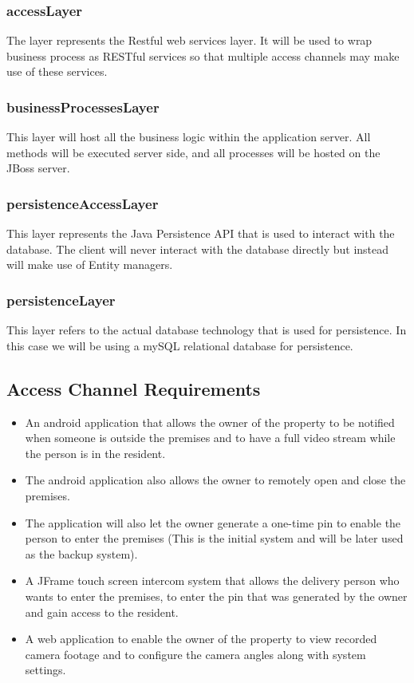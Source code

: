 \documentclass[a4paper,12pt]{article}
\begin{document}
	\subsubsection{accessLayer}
	The layer represents the Restful web services layer. It will be used to wrap business process as RESTful services so that multiple access channels may make use of these services. 
	\subsubsection{businessProcessesLayer}
	This layer will host all the business logic within the application server. All methods will be executed server side, and all processes will be hosted on the JBoss server.
	\subsubsection{persistenceAccessLayer}
	This layer represents the Java Persistence API that is used to interact with the database. The client will never interact with the database directly but instead will make use of Entity managers.
	\subsubsection{persistenceLayer}
	This layer refers to the actual database technology that is used for persistence. In this case we will be using a mySQL relational database for persistence.
	
	\subsection{Access Channel Requirements}
	\begin{itemize}
		\item An android application that allows the owner of the property to be notified when someone is outside the premises and to have a full video stream while the person is in the resident.
		
		\item The android application also allows the owner to remotely open and close the premises.
		
		\item The application will also let the owner generate a one-time pin to enable the person to enter the premises (This is the initial system and will be later used as the backup system).  
		
		\item A JFrame touch screen intercom system that allows the delivery person who wants to enter the premises, to enter the pin that was generated by the owner and gain access to the resident.
		
		\item A web application to enable the owner of the property to view recorded camera footage and to configure the camera angles along with system settings. 
	\end{itemize}
	
\end{document}
